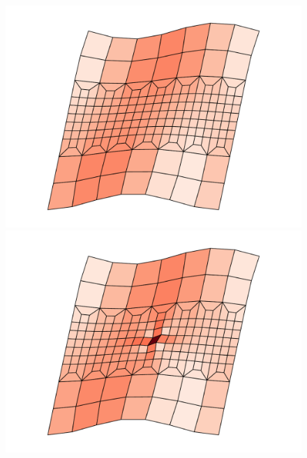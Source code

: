 \documentclass[fleqn]{goose-article}
\begin{document}
\begin{figure}[htp]
    \centering
    \captionsetup[subfigure]{justification=centering}
    \begin{minipage}[t]{.40\textwidth}
        \centering
        \includegraphics[width=\textwidth]{example_prestress_config.pdf}
    \end{minipage}
    \hspace{0.01\textwidth}
    \begin{minipage}[t]{.40\textwidth}
        \centering
        \includegraphics[width=\textwidth]{example_prestress_config-perturbed.pdf}
    \end{minipage}

\end{figure}
\end{document}

